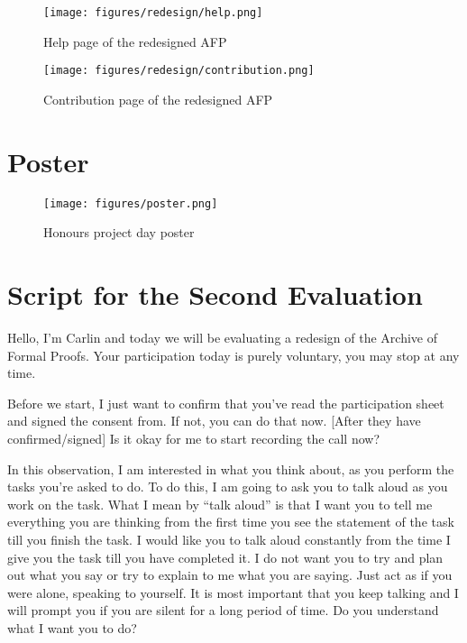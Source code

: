 \documentclass[bsc,frontabs,oneside,singlespacing,parskip,deptreport,logo]{infthesis}
\begin{document}
\begin{figure}[h]
    \centering
    \texttt{[image: figures/redesign/help.png]}
    \caption{Help page of the redesigned AFP}

\end{figure}

\begin{figure}[h]
    \centering
    \texttt{[image: figures/redesign/contribution.png]}
    \caption{Contribution page of the redesigned AFP}
\end{figure}

\chapter{Poster}

\begin{figure}[h]
    \centering
    \texttt{[image: figures/poster.png]}
    \caption{Honours project day poster}
\end{figure}

\chapter{Script for the Second Evaluation} \label{eval-script}

Hello, I’m Carlin and today we will be evaluating a redesign of the Archive of Formal Proofs. Your participation today is purely voluntary, you may stop at any time. 

Before we start, I just want to confirm that you’ve read the participation sheet and signed the consent from. If not, you can do that now. [After they have confirmed/signed] Is it okay for me to start recording the call now? 

In this observation, I am interested in what you think about, as you perform the tasks you’re asked to do. To do this, I am going to ask you to talk aloud as you work on the task. What I mean by “talk aloud” is that I want you to tell me everything you are thinking from the first time you see the statement of the task till you finish the task. I would like you to talk aloud constantly from the time I give you the task till you have completed it. I do not want you to try and plan out what you say or try to explain to me what you are saying. Just act as if you were alone, speaking to yourself. It is most important that you keep talking and I will prompt you if you are silent for a long period of time. Do you understand what I want you to do? 
\end{document}
